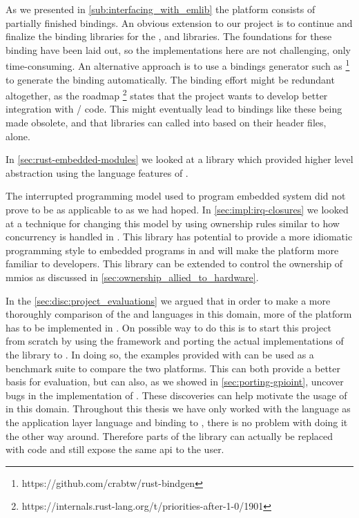 As we presented in \autoref{sub:interfacing_with_emlib} the platform consists of partially finished bindings.
An obvious extension to our project is to continue and finalize the binding libraries for the {\emlib}, {\emdrv} and {\cmsis} libraries.
The foundations for these binding have been laid out, so the implementations here are not challenging, only time-consuming.
An alternative approach is to use a bindings generator such as  \footnote{https://github.com/crabtw/rust-bindgen} to generate the binding automatically.
The binding effort might be redundant altogether, as the {\rust} roadmap \footnote{https://internals.rust-lang.org/t/priorities-after-1-0/1901} states that the project wants to develop better integration with {\C}/{\Cpp} code.
This might eventually lead to bindings like these being made obsolete, and that {\C} libraries can called into based on their header files, alone.

In \autoref{sec:rust-embedded-modules} we looked at a library which provided higher level abstraction using the language features of {\rust}.

The interrupted programming model used to program embedded system did not prove to be as applicable to {\rust} as we had hoped.
In \autoref{sec:impl:irq-closures} we looked at a technique for changing this model by using ownership rules similar to how concurrency is handled in {\rust}.
This library has potential to provide a more idiomatic programming style to embedded programs in {\rust} and will make the platform more familiar to {\rust} developers.
This library can be extended to control the ownership of \glspl{mmio} as discussed in \autoref{sec:ownership_allied_to_hardware}.

In the \autoref{sec:disc:project_evaluations} we argued that in order to make a more thoroughly comparison of the {\C} and {\rust} languages in this domain, more of the platform has to be implemented in {\rust}.
On possible way to do this is to start this project from scratch by using the  framework and porting the actual implementations of the {\emlib} library to {\rust}.
In doing so, the examples provided with {\emlib} can be used as a benchmark suite to compare the two platforms.
This can both provide a better basis for evaluation, but can also, as we showed in \autoref{sec:porting-gpioint}, uncover bugs in the {\C} implementation of {\emlib}.
These discoveries can help motivate the usage of {\rust} in this domain.
Throughout this thesis we have only worked with the {\rust} language as the application layer language and binding to {\C}, there is no problem with doing it the other way around.
Therefore parts of the {\emlib} library can actually be replaced with {\rust} code and still expose the same \gls{api} to the user.
